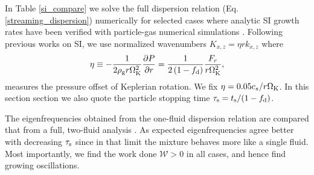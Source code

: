 
In Table \ref{si_compare} we solve the full dispersion relation
(Eq. \ref{streaming_dispersion}) numerically for selected cases where
analytic SI growth rates have been verified with particle-gas
numerical simulations \citep[namely][]{youdin07b,bai10b}.  
Following previous works on SI, we use normalized 
wavenumbers $K_{x,z} = \eta r k_{x,z}$ where
\begin{align} 
  \eta \equiv -\frac{1}{2\rho_\mathrm{g} r\Omega_{\rm K}^2}\frac{\partial P}{\partial r} = 
  \frac{1}{2\left(1-f_\mathrm{d}\right)}\frac{F_r}{r\Omega_{\rm K}^2}, 
\end{align} 
measures the pressure offset of Keplerian rotation. We fix 
$\eta=0.05c_s/r\Omega_{\rm K}$. In this section section we also quote the
particle stopping time $\tau_\mathrm{s}=t_\mathrm{s}/(1-f_\mathrm{d})$.    

The eigenfrequencies obtained from the one-fluid dispersion relation 
are compared that from a full, two-fluid analysis \citep[similar 
to][]{youdin05a, kowalik13}. As expected eigenfrequencies agree better
with decreasing $\tau_\mathrm{s}$ since in that limit the mixture behaves more 
like a single fluid. Most importantly, we find the work done
$\mathcal{W}>0$ in all cases, and hence find growing oscillations. 



